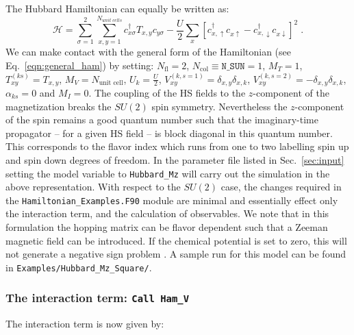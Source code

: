 The Hubbard Hamiltonian can equally be written as:
\begin{equation}
\label{eqn_hubbard_Mz}
\mathcal{H}=
\sum\limits_{\sigma=1}^{2} 
\sum\limits_{x,y =1 }^{N_{unit\; cells }} 
  c^{\dagger}_{x \sigma} T_{x,y}c^{\phantom\dagger}_{y \sigma} 
- \frac{U}{2}\sum\limits_{x}\left[
c^{\dagger}_{x, \uparrow} c^{\phantom\dagger}_{x \uparrow}  -   c^{\dagger}_{x, \downarrow} c^{\phantom\dagger}_{x \downarrow}  \right]^{2}\;.
\end{equation} 
We can make contact with the general form of the Hamiltonian  (see Eq.~\ref{eqn:general_ham}) by setting: 
$N_{\mathrm{fl}} = 2$, $N_{\mathrm{col}} \equiv \texttt{N\_SUN}     =1 $,   $M_T    =    1$,  $T^{(ks)}_{x y}   =  T_{x,y}$,  $M_V   =  N_{\text{unit cell}} $,  $U_{k}       =   \frac{U}{2}$, 
 $V_{x y}^{(k, s=1)} =  \delta_{x,y} \delta_{x,k}  $,  $V_{x y}^{(k, s=2)} =  - \delta_{x,y} \delta_{x,k}  $,  $\alpha_{ks}   = 0  $ and $M_I       = 0 $.   
 The coupling of the HS fields to the $z$-component of   the magnetization breaks the $SU(2)$ spin symmetry. Nevertheless the $z$-component of the spin remains a good quantum number such that the imaginary-time propagator -- for a given HS field -- is block  diagonal in this quantum number. This corresponds to the flavor index  which runs from one to two  labelling spin up and spin down  degrees of freedom.       In the parameter file  listed in  Sec.~\ref{sec:input}  setting the model variable to  \texttt{Hubbard\_Mz}  will carry out the simulation in the above representation. 
 With respect to the $SU(2)$ case, the changes required in the \texttt{Hamiltonian\_Examples.F90}   module are  minimal and essentially effect only the interaction term, and the calculation of observables.  We note that  in this formulation the  hopping matrix can be flavor dependent such that a Zeeman  magnetic field can be introduced.  If the chemical potential is set to zero, this will not generate a negative sign problem \cite{Wu04,Milat04,Bercx09}.    
 A sample run for this model can be found in \texttt{Examples/Hubbard\_Mz\_Square/}.

\subsubsection{The interaction term: \texttt{Call Ham\_V} } 
The interaction term is now given by: 

